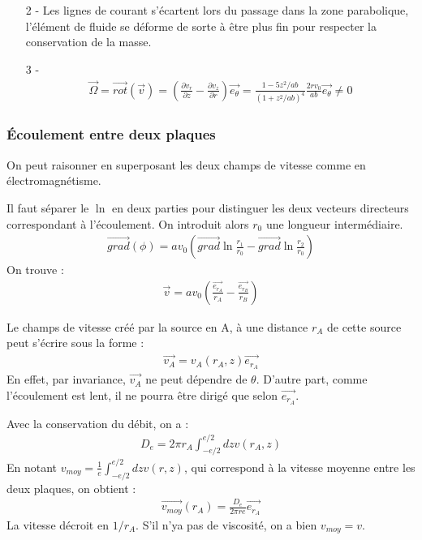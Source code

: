 \documentclass{report}
\begin{document}
\begin{itemize}
\item[2 - ] Les lignes de courant s'écartent lors du passage dans la zone parabolique, l'élément de fluide se déforme de sorte à être plus fin pour respecter la conservation de la masse. 

\item[3 - ] \begin{align*}
\vec{\Omega}=\vec{rot}(\vec{v})=\left(\frac{\partial v_r}{\partial z}-\frac{\partial v_z}{\partial r} \right)\vec{e_\theta}=\frac{1-5z^2/ab}{\left( 1+z^2/ab\right)^4}\frac{2rv_0}{ab}\vec{e_\theta}\neq 0
\end{align*}

\end{itemize}

\subsubsection*{Écoulement entre deux plaques}

On peut raisonner en superposant les deux champs de vitesse comme en électromagnétisme. 

Il faut séparer le $\ln$ en deux parties pour distinguer les deux vecteurs directeurs correspondant à l'écoulement. On introduit alors $r_0$ une longueur intermédiaire.
\begin{align*}
	\vec{grad}(\phi)=av_0\left(\vec{grad}\ln\frac{r_1}{r_0}-\vec{grad}\ln\frac{r_2}{r_0} \right) 
\end{align*}
On trouve :
\begin{align*}
\vec{v}=av_0\left(\frac{\vec{e_{r_A}}}{r_A}-\frac{\vec{e_{r_B}}}{r_B} \right) 
\end{align*}

Le champs de vitesse créé par la source en A, à une distance $r_A$ de cette source peut s'écrire sous la forme :
\begin{align*}
	\vec{v_A} = v_A(r_A,z)\vec{e_{r_A}}
\end{align*} 
En effet, par invariance, $\vec{v_A}$ ne peut dépendre de $\theta$. D'autre part, comme l'écoulement est lent, il ne pourra être dirigé que selon $\vec{e_{r_A}}$.

Avec la conservation du débit, on a :
\begin{align*}
	D_e = 2\pi r_A\int_{-e/2}^{e/2}dz v(r_A,z)
\end{align*}
En notant $v_{moy}=\frac{1}{e}\int_{-e/2}^{e/2}dz v(r,z)$, qui correspond à la vitesse moyenne entre les deux plaques, on obtient :
\begin{align*}
	\vec{v_{moy}}(r_A) = \frac{D_e}{2\pi r e}\vec{e_{r_A}}
\end{align*}
La vitesse décroit en $1/r_A$. S'il n'ya pas de viscosité, on a bien $v_{moy}=v$.
\end{document}
